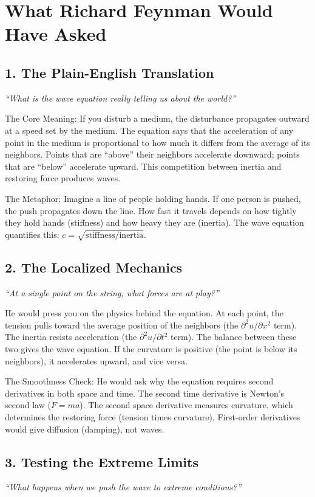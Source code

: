 \documentclass[11pt,openright]{book}
\begin{document}
\section*{What Richard Feynman Would Have Asked}

\subsection*{1. The Plain-English Translation}
\textit{``What is the wave equation really telling us about the world?''}

The Core Meaning: If you disturb a medium, the disturbance propagates outward at a speed set by the medium. The equation says that the acceleration of any point in the medium is proportional to how much it differs from the average of its neighbors. Points that are ``above'' their neighbors accelerate downward; points that are ``below'' accelerate upward. This competition between inertia and restoring force produces waves.

The Metaphor: Imagine a line of people holding hands. If one person is pushed, the push propagates down the line. How fast it travels depends on how tightly they hold hands (stiffness) and how heavy they are (inertia). The wave equation quantifies this: $c = \sqrt{\text{stiffness}/\text{inertia}}$.

\subsection*{2. The Localized Mechanics}
\textit{``At a single point on the string, what forces are at play?''}

He would press you on the physics behind the equation. At each point, the tension pulls toward the average position of the neighbors (the $\partial^2 u/\partial x^2$ term). The inertia resists acceleration (the $\partial^2 u/\partial t^2$ term). The balance between these two gives the wave equation. If the curvature is positive (the point is below its neighbors), it accelerates upward, and vice versa.

The Smoothness Check: He would ask why the equation requires second derivatives in both space and time. The second time derivative is Newton's second law ($F = ma$). The second space derivative measures curvature, which determines the restoring force (tension times curvature). First-order derivatives would give diffusion (damping), not waves.

\subsection*{3. Testing the Extreme Limits}
\textit{``What happens when we push the wave to extreme conditions?''}
\end{document}
